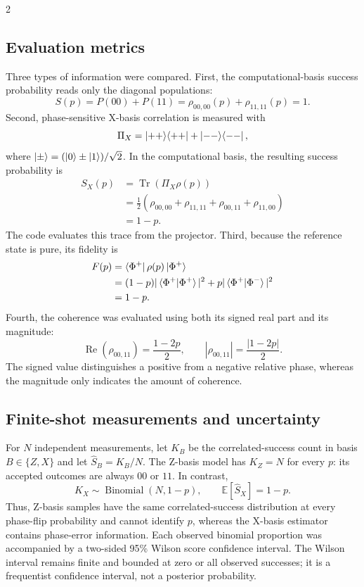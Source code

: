 \documentclass[a4paper,10pt]{article}
\begin{document}
\begin{multicols}{2}
\subsection*{Evaluation metrics}
Three types of information were compared.  First, the computational-basis
success probability reads only the diagonal populations:
\begin{equation}
S(p)=P(00)+P(11)=\rho_{00,00}(p)+\rho_{11,11}(p)=1. \label{eq:success}
\end{equation}
Second, phase-sensitive X-basis correlation is measured with
\begin{equation}
\Pi_X=\ket{++}\!\bra{++}+\ket{--}\!\bra{--},
\end{equation}
where $\ket{\pm}=(\ket{0}\pm\ket{1})/\sqrt{2}$. In the computational basis,
the resulting success probability is
\begin{align}
S_X(p)&=\operatorname{Tr}(\Pi_X\rho(p)) \\
&=\frac12\left(\rho_{00,00}+\rho_{11,11}+\rho_{00,11}+\rho_{11,00}\right) \\
&=1-p. \label{eq:x-success}
\end{align}
The code evaluates this trace from the projector. Third, because the reference state is pure, its fidelity is
\begin{align}
F(p)&=\bra{\Phi^+}\rho(p)\ket{\Phi^+} \\
&=(1-p)|\braket{\Phi^+|\Phi^+}|^2
+p|\braket{\Phi^+|\Phi^-}|^2 \\
&=1-p. \label{eq:fidelity}
\end{align}
Fourth, the coherence was evaluated using both its signed real part and its
magnitude:
\begin{equation}
\operatorname{Re}(\rho_{00,11})=\frac{1-2p}{2}, \qquad
|\rho_{00,11}|=\frac{|1-2p|}{2}. \label{eq:coherence}
\end{equation}
The signed value distinguishes a positive from a negative relative phase,
whereas the magnitude only indicates the amount of coherence.

\subsection*{Finite-shot measurements and uncertainty}
For $N$ independent measurements, let $K_B$ be the correlated-success count
in basis $B\in\{Z,X\}$ and let $\widehat{S}_B=K_B/N$.  The Z-basis model has
$K_Z=N$ for every $p$: its accepted outcomes are always $00$ or $11$.
In contrast,
\begin{equation}
K_X\sim\operatorname{Binomial}(N,1-p), \qquad
\mathbb{E}[\widehat{S}_X]=1-p. \label{eq:finite-shot-x}
\end{equation}
Thus, Z-basis samples have the same correlated-success distribution at every
phase-flip probability and cannot identify $p$, whereas the X-basis estimator
contains phase-error information.  Each observed binomial proportion was
accompanied by a two-sided 95\% Wilson score confidence interval.  The Wilson
interval remains finite and bounded at zero or all observed successes; it is a
frequentist confidence interval, not a posterior probability.


\end{multicols}
\end{document}
